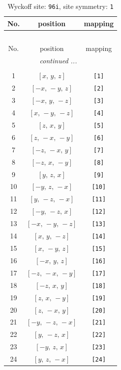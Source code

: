 \documentclass[fleqn,8pt]{jsarticle}
\begin{document}
\begin{longtable}{ccc}
\caption{Wyckoff site: {\tt 96i}, site symmetry: {\tt 1}}
 \\
 \hline \hline
No. & position & mapping \\ \hline \endfirsthead

\multicolumn{2}{l}{\tablename\ \thetable{}} \\
 \hline \hline
No. & position & mapping \\ \hline \endhead

 \hline \hline
\multicolumn{2}{r}{\footnotesize\it continued ...} \\ \endfoot

 \hline \hline
\multicolumn{2}{r}{} \\ \endlastfoot

1 & $\left[ x,\, y,\, z \right]$ & {\tt [1]} \\ \hline
2 & $\left[ - x,\, - y,\, z \right]$ & {\tt [2]} \\ \hline
3 & $\left[ - x,\, y,\, - z \right]$ & {\tt [3]} \\ \hline
4 & $\left[ x,\, - y,\, - z \right]$ & {\tt [4]} \\ \hline
5 & $\left[ z,\, x,\, y \right]$ & {\tt [5]} \\ \hline
6 & $\left[ z,\, - x,\, - y \right]$ & {\tt [6]} \\ \hline
7 & $\left[ - z,\, - x,\, y \right]$ & {\tt [7]} \\ \hline
8 & $\left[ - z,\, x,\, - y \right]$ & {\tt [8]} \\ \hline
9 & $\left[ y,\, z,\, x \right]$ & {\tt [9]} \\ \hline
10 & $\left[ - y,\, z,\, - x \right]$ & {\tt [10]} \\ \hline
11 & $\left[ y,\, - z,\, - x \right]$ & {\tt [11]} \\ \hline
12 & $\left[ - y,\, - z,\, x \right]$ & {\tt [12]} \\ \hline
13 & $\left[ - x,\, - y,\, - z \right]$ & {\tt [13]} \\ \hline
14 & $\left[ x,\, y,\, - z \right]$ & {\tt [14]} \\ \hline
15 & $\left[ x,\, - y,\, z \right]$ & {\tt [15]} \\ \hline
16 & $\left[ - x,\, y,\, z \right]$ & {\tt [16]} \\ \hline
17 & $\left[ - z,\, - x,\, - y \right]$ & {\tt [17]} \\ \hline
18 & $\left[ - z,\, x,\, y \right]$ & {\tt [18]} \\ \hline
19 & $\left[ z,\, x,\, - y \right]$ & {\tt [19]} \\ \hline
20 & $\left[ z,\, - x,\, y \right]$ & {\tt [20]} \\ \hline
21 & $\left[ - y,\, - z,\, - x \right]$ & {\tt [21]} \\ \hline
22 & $\left[ y,\, - z,\, x \right]$ & {\tt [22]} \\ \hline
23 & $\left[ - y,\, z,\, x \right]$ & {\tt [23]} \\ \hline
24 & $\left[ y,\, z,\, - x \right]$ & {\tt [24]} \\
\end{longtable}
\end{document}
